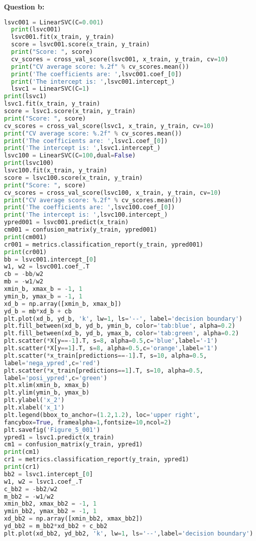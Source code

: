 \documentclass[10pt]{article}
\begin{document}
\textbf{Question b:}
\begin{lstlisting}[language=Python]
  lsvc001 = LinearSVC(C=0.001)
  print(lsvc001)
  lsvc001.fit(x_train, y_train)
  score = lsvc001.score(x_train, y_train)
  print("Score: ", score)
  cv_scores = cross_val_score(lsvc001, x_train, y_train, cv=10)
  print("CV average score: %.2f" % cv_scores.mean())
  print('The coefficients are: ',lsvc001.coef_[0])
  print('The intercept is: ',lsvc001.intercept_)
  lsvc1 = LinearSVC(C=1)
print(lsvc1)
lsvc1.fit(x_train, y_train)
score = lsvc1.score(x_train, y_train)
print("Score: ", score)
cv_scores = cross_val_score(lsvc1, x_train, y_train, cv=10)
print("CV average score: %.2f" % cv_scores.mean())
print('The coefficients are: ',lsvc1.coef_[0])
print('The intercept is: ',lsvc1.intercept_)
lsvc100 = LinearSVC(C=100,dual=False)
print(lsvc100)
lsvc100.fit(x_train, y_train)
score = lsvc100.score(x_train, y_train)
print("Score: ", score)
cv_scores = cross_val_score(lsvc100, x_train, y_train, cv=10)
print("CV average score: %.2f" % cv_scores.mean())
print('The coefficients are: ',lsvc100.coef_[0])
print('The intercept is: ',lsvc100.intercept_)
ypred001 = lsvc001.predict(x_train)
cm001 = confusion_matrix(y_train, ypred001)
print(cm001)
cr001 = metrics.classification_report(y_train, ypred001)
print(cr001)
bb = lsvc001.intercept_[0]
w1, w2 = lsvc001.coef_.T
cb = -bb/w2
mb = -w1/w2
xmin_b, xmax_b = -1, 1
ymin_b, ymax_b = -1, 1
xd_b = np.array([xmin_b, xmax_b])
yd_b = mb*xd_b + cb
plt.plot(xd_b, yd_b, 'k', lw=1, ls='--', label='decision boundary')
plt.fill_between(xd_b, yd_b, ymin_b, color='tab:blue', alpha=0.2)
plt.fill_between(xd_b, yd_b, ymax_b, color='tab:green', alpha=0.2)
plt.scatter(*X[y==-1].T, s=8, alpha=0.5,c='blue',label='-1')
plt.scatter(*X[y==1].T, s=8, alpha=0.5,c='orange',label='1')
plt.scatter(*x_train[predictions==-1].T, s=10, alpha=0.5, 
label='nega_ypred',c='red')
plt.scatter(*x_train[predictions==1].T, s=10, alpha=0.5,
label='posi_ypred',c='green')
plt.xlim(xmin_b, xmax_b)
plt.ylim(ymin_b, ymax_b)
plt.ylabel('x_2')
plt.xlabel('x_1')
plt.legend(bbox_to_anchor=(1.2,1.2), loc='upper right', 
fancybox=True, framealpha=1,fontsize=10,ncol=2)
plt.savefig('Figure_5_001')
ypred1 = lsvc1.predict(x_train)
cm1 = confusion_matrix(y_train, ypred1)
print(cm1)
cr1 = metrics.classification_report(y_train, ypred1)
print(cr1)
bb2 = lsvc1.intercept_[0]
w1, w2 = lsvc1.coef_.T
c_bb2 = -bb2/w2
m_bb2 = -w1/w2
xmin_bb2, xmax_bb2 = -1, 1
ymin_bb2, ymax_bb2 = -1, 1
xd_bb2 = np.array([xmin_bb2, xmax_bb2])
yd_bb2 = m_bb2*xd_bb2 + c_bb2
plt.plot(xd_bb2, yd_bb2, 'k', lw=1, ls='--',label='decision boundary')

\end{lstlisting}
\end{document}
